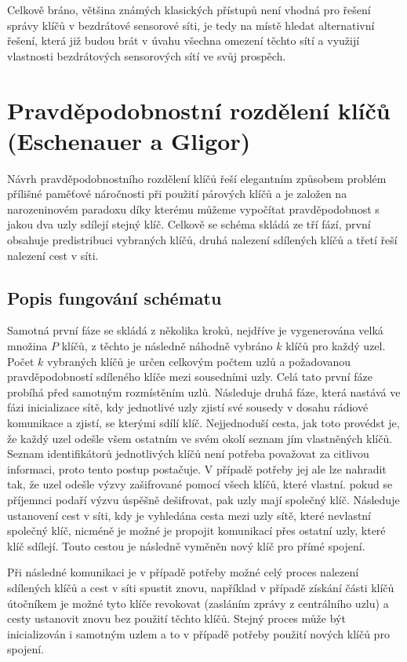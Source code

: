 \documentclass[11pt,final,twoside]{fithesis2}
\begin{document}
Celkově bráno, většina známých klasických přístupů není vhodná pro řešení správy klíčů v bezdrátové sensorové síti, je tedy na místě hledat alternativní řešení,
která již budou brát v úvahu všechna omezení těchto sítí a využijí vlastnosti bezdrátových sensorových sítí ve svůj prospěch.

\section{Pravděpodobnostní rozdělení klíčů (Eschenauer a Gligor)}
Návrh pravděpodobnostního rozdělení klíčů\cite{Eschenauer2002} řeší elegantním způsobem problém přílišné paměťové náročnosti při použití párových klíčů a je 
založen na narozeninovém paradoxu\cite{Flajolet1992} díky kterému můžeme vypočítat pravděpodobnost s jakou dva uzly sdílejí stejný klíč. 
Celkově se schéma skládá ze tří fází, první obsahuje predistribuci vybraných klíčů, druhá nalezení sdílených klíčů a třetí řeší nalezení cest v síti.

\subsection{Popis fungování schématu}
Samotná první fáze se skládá z několika kroků, nejdříve je vygenerována velká množina $P$ klíčů, z těchto je následně náhodně vybráno $k$ klíčů pro každý
uzel. Počet $k$ vybraných klíčů je určen celkovým počtem uzlů a požadovanou pravděpodobností sdíleného klíče mezi sousedními uzly. Celá tato první fáze 
probíhá před samotným rozmístěním uzlů. Následuje druhá fáze, která nastává ve fázi inicializace sítě, kdy jednotlivé uzly zjistí své sousedy v dosahu 
rádiové komunikace a zjistí, se kterými sdílí klíč. Nejjednoduší cesta, jak toto provédst je, že každý uzel odešle všem ostatním ve svém okolí seznam jím 
vlastněných klíčů. Seznam identifikátorů jednotlivých klíčů není potřeba považovat za citlivou informaci, proto tento postup postačuje. V případě potřeby 
jej ale lze nahradit tak, že uzel odešle výzvy zašifrované pomocí všech klíčů, které vlastní. pokud se příjemnci podaří výzvu úspěšně dešifrovat, pak
uzly mají společný klíč. Následuje ustanovení cest v síti, kdy je vyhledána cesta mezi uzly sítě, které nevlastní společný klíč, nicméně je možné je propojit 
komunikací přes ostatní uzly, které klíč sdílejí. Touto cestou je následně vyměněn nový klíč pro přímé spojení. 

Při následné komunikaci je v případě potřeby možné celý proces nalezení sdílených klíčů a cest v síti spustit znovu, například v případě získání části klíčů útočníkem
je možné tyto klíče revokovat (zasláním zprávy z centrálního uzlu) a cesty ustanovit znovu bez použití těchto klíčů. Stejný proces může být inicializován i samotným uzlem
a to v případě potřeby použití nových klíčů pro spojení. 
\end{document}
